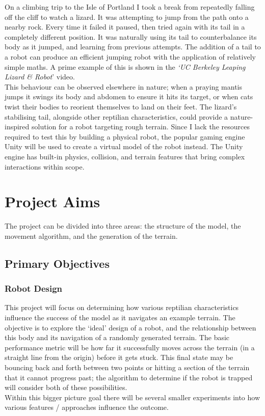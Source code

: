 \documentclass{article}
\begin{document}
On a climbing trip to the Isle of Portland I took a break from repeatedly falling off the cliff to watch a lizard. It was attempting to jump from the path onto a nearby rock. Every time it failed it paused, then tried again with its tail in a completely different position. It was naturally using its tail to counterbalance its body as it jumped, and learning from previous attempts. The addition of a tail to a robot can produce an efficient jumping robot with the application of relatively simple maths. A prime example of this is shown in the \textit{‘UC Berkeley Leaping Lizard \& Robot}’ video.\\  This behaviour can be observed elsewhere in nature; when a praying mantis jumps it swings its body and abdomen to ensure it hits its target,   or when cats twist their bodies to reorient themselves to land on their feet. 
The lizard’s stabilising tail, alongside other reptilian characteristics, could provide a nature-inspired solution for a robot targeting rough terrain. Since I lack the resources required to test this by building a physical robot, the popular gaming engine Unity  will be used to create a virtual model of the robot instead. The Unity engine has built-in physics, collision, and terrain features that bring complex interactions within scope.


\newpage
\section{Project Aims}
The project can be divided into three areas: the structure of the model, the movement algorithm, and the generation of the terrain. \\


\subsection{Primary Objectives}
\subsubsection{Robot Design}
This project will focus on determining how various reptilian characteristics influence the success of the model as it navigates an example terrain. The objective is to explore the ‘ideal’ design of a robot, and the relationship between this body and its navigation of a randomly generated terrain. The basic performance metric will be how far it successfully moves across the terrain (in a straight line from the origin) before it gets stuck. This final state may be bouncing back and forth between two points or hitting a section of the terrain that it cannot progress past; the algorithm to determine if the robot is trapped will consider both of these possibilities. \\
Within this bigger picture goal there will be several smaller experiments into how various features / approaches influence the outcome. \\
\end{document}
